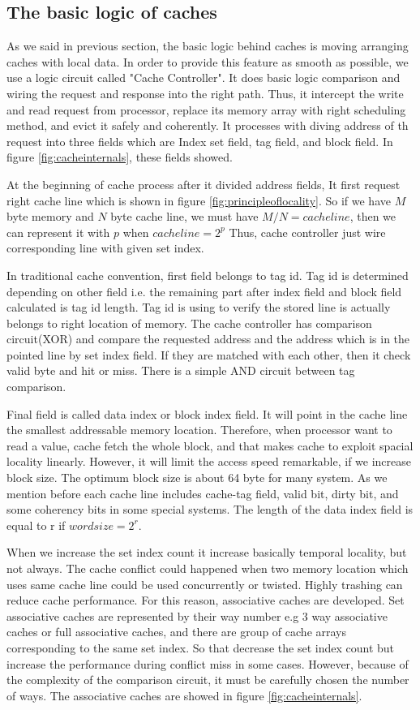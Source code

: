 \subsection{The basic logic of caches}
As we said in previous section, the basic logic behind caches is moving arranging caches with local data. In order to provide this feature as smooth as possible, we use a logic circuit called "Cache Controller". It does basic logic comparison and wiring the request and response into the right path. Thus, it intercept the write and read request from processor, replace its memory array with right scheduling method, and evict it safely and coherently. It processes with diving address of th request into three fields which are  Index set field, tag field, and block field. In figure \ref{fig:cacheinternals}, these fields showed. 

At the beginning of cache process after it divided address fields, It first request right cache line which is shown in figure \ref{fig:principleoflocality}. So if we have $M$ byte memory and $N$ byte cache line, we must have $M/N = cache line$, then we can represent it with $p$ when $cache line = 2^{p}$ Thus, cache controller just wire corresponding line with given set index. 

In traditional cache convention, first field belongs to tag id. Tag id is determined depending on other field i.e. the remaining part after index field and block field calculated is tag id length. Tag id is using to verify the stored line is actually belongs to right location of memory. The cache controller has comparison circuit(XOR) and compare the requested address and the address which is in the pointed line by set index field. If they are matched with each other, then it check valid byte and hit or miss. There is a simple AND circuit between tag comparison. 

Final field is called data index or block index field. It will point in the cache line the smallest addressable memory location. Therefore, when processor want to read a value, cache fetch the whole block, and that makes cache to exploit spacial locality linearly. However, it will limit the access speed remarkable, if we increase block size. The optimum block size is about 64 byte for many system. As we mention before each cache line includes cache-tag field, valid bit, dirty bit, and some coherency bits in some special systems. The length of the data index field is equal to r if  $ word size = 2^{r}  $.

When we increase the set index count it increase basically temporal locality, but not always. The cache conflict could happened when two memory location which uses same cache line could be used concurrently or twisted. Highly trashing can reduce cache performance. For this reason, associative caches are developed. Set associative caches are represented by their way number e.g 3 way associative caches or full associative caches, and there are group of cache arrays corresponding to the same set index. So that decrease the set index count but increase the performance during conflict miss in some cases. However, because of the complexity of the comparison circuit, it must be carefully chosen the number of ways. The associative caches are showed in figure \ref{fig:cacheinternals}. 

